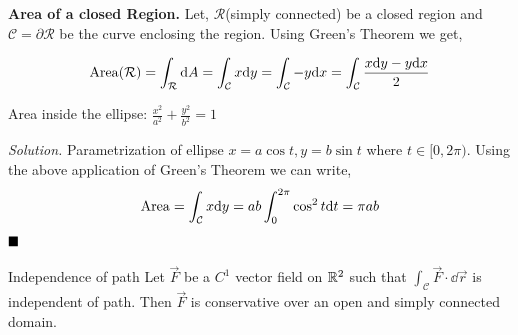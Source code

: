 \documentclass[../Analysis-3]{subfiles}
\begin{document}
\begin{tcolorbox}
    \textbf{Area of a closed Region.} Let, $\mathcal{R}$(simply connected) be a closed region and $\mathcal{C} = \partial{\mathcal{R}}$ be the curve enclosing the region. Using Green's Theorem we get,

    \[\operatorname{Area}(\mathcal{R}) = \int_{\mathcal{R}} \dd A = \int_{\mathcal{C}} x \dd y = \int_{\mathcal{C}} -y \dd x = \int_{\mathcal{C}} \frac{x \dd y -y \dd x}{2} \]

\end{tcolorbox}

\begin{Eg}{Area inside the ellipse: $\frac{x^2}{a^2} + \frac{y^2}{b^2} = 1$}{}

    \textit{Solution.} Parametrization of ellipse $x = a \cos t, y = b \sin t$ where $t \in [0,2\pi)$. Using the above application of Green's Theorem we can write,
    \[\operatorname{Area} = \int_{\mathcal{C}} x \dd y = ab \int_{0}^{2\pi} \cos^2t \dd t = \pi ab \]
    $\hfill \blacksquare$
\end{Eg}

\begin{Thm}{Independence of path}{}
    Let $\vec{F}$ be a $C^1$ vector field on $\mathbb{R}^2$ such that $\displaystyle\int_{\mathcal{C}} \vec{F} \cdot \dd \vec{r}$ is independent of path. Then $\vec{F}$ is conservative over an open and simply connected domain.
\end{Thm}
\end{document}
